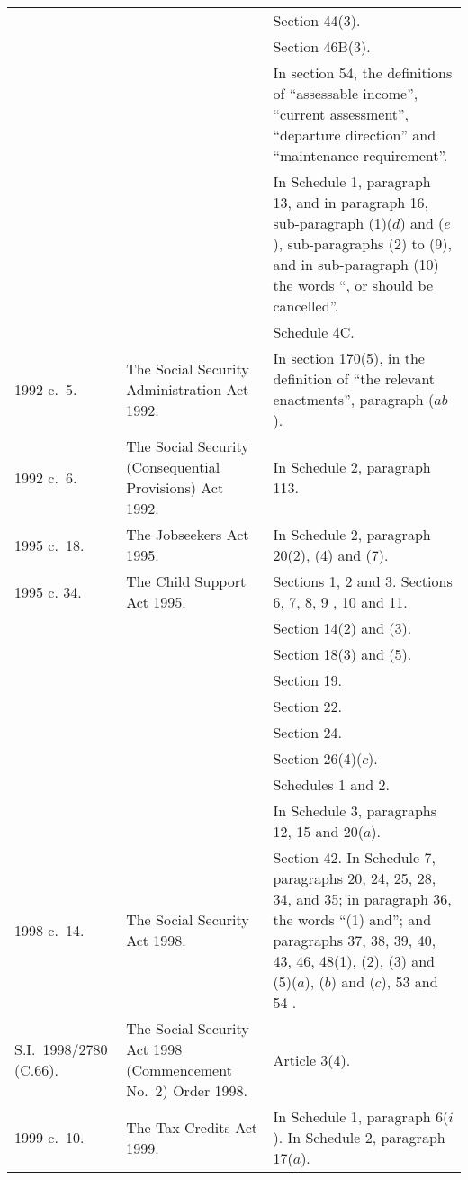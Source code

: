 \documentclass[12pt,a4paper]{article}
\begin{document}
{\begin{longtable}{p{50pt}p{83.27403pt}p{220.72266pt}}
		&&Section 44(3).\\
		&&Section 46B(3).\\
		&&In section 54, the definitions of “assessable income”, “current assessment”, “departure direction” and “maintenance requirement”.\\
		&&In Schedule 1, paragraph 13, and in paragraph 16, sub-paragraph (1)($d$)  and ($e$), sub-paragraphs (2)  to (9), and in sub-paragraph (10)  the words “, or should be cancelled”.\\
		&&Schedule 4C.\\
1992 c.\ 5. 	&The Social Security Administration Act 1992. 	&In section 170(5), in the definition of “the relevant enactments”, paragraph ($ab$).\\
1992 c.\ 6. 	&The Social Security (Consequential Provisions) Act 1992. 	&In Schedule 2, paragraph 113. \\
1995 c.\ 18. 	&The Jobseekers Act 1995. 	&In Schedule 2, paragraph 20(2), (4)  and (7).\\
1995 c. 34. 	&The Child Support Act 1995. 	&Sections 1, 2 and 3. \newline
Sections 6, 7, 8, 9%
, 10 
and 11. \\
		&&Section 14(2)  and (3).\\
		&&Section 18(3)  and (5).\\
		&&Section 19. \\
		&&Section 22. \\
		&&Section 24. \\
		&&Section 26(4)($c$).\\
		&&Schedules 1 and 2. \\
		&&In Schedule 3, paragraphs 12, 15 and 20($a$).\\
1998 c.\ 14. 	&The Social Security Act 1998. 	&Section 42. \newline
In Schedule 7, paragraphs 20, 24, 25, 
28, 34, and 35; in paragraph 36, the words “(1)  and”; and paragraphs 37, 38, 39, 40, 43, 46, 48(1), (2), (3)  and (5)($a$), ($b$)  and ($c$), 53 and 54%
.\\ 
S.I.\ 1998/\hspace{0pt}2780 (C.66).	&The Social Security Act 1998 (Commencement No.\ 2) Order 1998. 	&Article 3(4).\\
1999 c.\ 10. 	&The Tax Credits Act 1999. 	&In Schedule 1, paragraph 6($i$).\newline
In Schedule 2, paragraph 17($a$).\\
\end{longtable}

}
\end{document}
